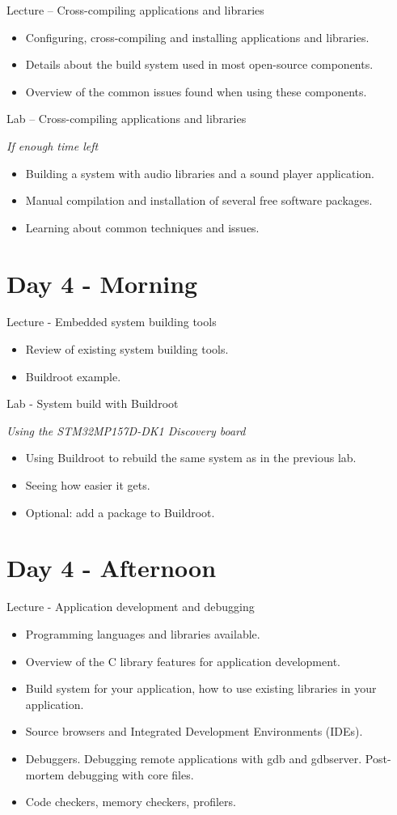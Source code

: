 \documentclass[a4paper,12pt,obeyspaces,spaces,hyphens]{article}
\begin{document}
\feagendatwocolumn
{Lecture – Cross-compiling applications and libraries}
{
  \begin{itemize}
  \item Configuring, cross-compiling and installing applications and libraries.
  \item Details about the build system used in most open-source components.
  \item Overview of the common issues found when using these components.
  \end{itemize}
}
{Lab – Cross-compiling applications and libraries}
{
  {\em If enough time left}
  \begin{itemize}
  \item Building a system with audio libraries and a sound player application.
  \item Manual compilation and installation of several free software packages.
  \item Learning about common techniques and issues.
  \end{itemize}
}

\section{Day 4 - Morning}

\feagendatwocolumn
{Lecture - Embedded system building tools}
{
  \begin{itemize}
  \item Review of existing system building tools.
  \item Buildroot example.
  \end{itemize}
}
{Lab - System build with Buildroot}
{
  {\em Using the STM32MP157D-DK1 Discovery board}
  \begin{itemize}
  \item Using Buildroot to rebuild the same system as in the previous lab.
  \item Seeing how easier it gets.
  \item Optional: add a package to Buildroot.
  \end{itemize}
}

\section{Day 4 - Afternoon}

\feagendaonecolumn
{Lecture - Application development and debugging}
{
  \begin{itemize}
  \item Programming languages and libraries available.
  \item Overview of the C library features for application development.
  \item Build system for your application,
        how to use existing libraries in your application.
  \item Source browsers and Integrated Development Environments (IDEs).
  \item Debuggers. Debugging remote applications with gdb and gdbserver.
        Post-mortem debugging with core files.
  \item Code checkers, memory checkers, profilers.
  \end{itemize}
}
\end{document}
